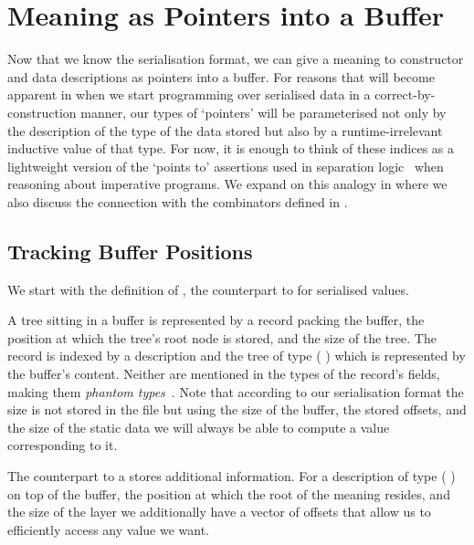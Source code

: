 \section{Meaning as Pointers into a Buffer}\label{sec:pointers}

Now that we know the serialisation format, we can give a meaning
to constructor and data descriptions as pointers into a buffer.
%
For reasons that will become apparent in 
when we start programming over serialised data in a correct-by-construction
manner, our types of `pointers' will be parameterised not only
by the description of the type of the data stored but also by a
runtime-irrelevant inductive value of that type.
%
For now, it is enough to think of these indices as a lightweight
version of the `points to' assertions used in separation
logic~\citep{DBLP:conf/lics/Reynolds02}
when reasoning about imperative programs.
%
We expand on this analogy in  where we
also discuss the connection with the combinators defined
in .

\subsection{Tracking Buffer Positions}

We start with the definition of ,
the counterpart to  for serialised values.


A tree sitting in a buffer is represented
by a record packing the buffer, the position at which the tree's
root node is stored, and the size of the tree.
%
The record is indexed by  a  description
and  the tree of type ( )
which is represented by the buffer's content.
Neither are mentioned in the types of the record's fields, making them
\emph{phantom types}~\citep{DBLP:conf/dsl/LeijenM99}.
%
Note that according to our serialisation format the size is not stored
in the file but using the size of the buffer, the stored offsets,
and the size of the static data we will always
be able to compute a value corresponding to it.


The counterpart to a  stores additional information.
%
For a description of type (   )
on top of the buffer, the position at which the root of the meaning resides,
and the size of the layer we additionally have a vector of  offsets
that allow us to efficiently access any value we want.

